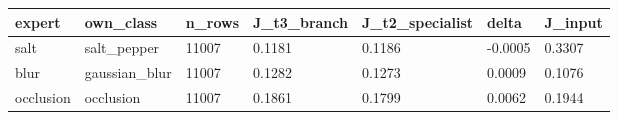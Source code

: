 \begin{tabular}{lllllll}
\hline
expert & own\_class & n\_rows & J\_t3\_branch & J\_t2\_specialist & delta & J\_input \\
\hline
salt & salt\_pepper & 11007 & 0.1181 & 0.1186 & -0.0005 & 0.3307 \\
blur & gaussian\_blur & 11007 & 0.1282 & 0.1273 & 0.0009 & 0.1076 \\
occlusion & occlusion & 11007 & 0.1861 & 0.1799 & 0.0062 & 0.1944 \\
\hline
\end{tabular}
